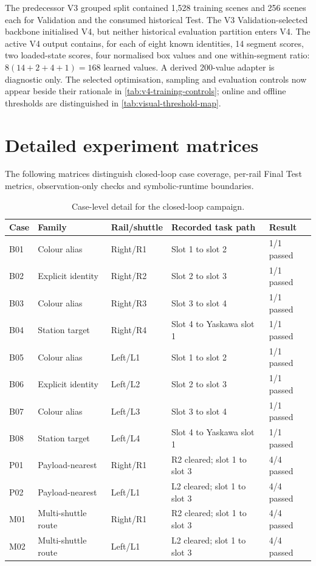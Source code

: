 The predecessor V3 grouped split contained 1,528 training scenes and 256 scenes
each for Validation and the consumed historical Test. The V3
Validation-selected backbone initialised V4, but neither historical evaluation
partition enters V4. The active V4 output contains, for each of eight known
identities, 14 segment scores, two loaded-state scores, four normalised box
values and one within-segment ratio: \(8(14+2+4+1)=168\) learned values. A
derived 200-value adapter is diagnostic only. The selected optimisation,
sampling and evaluation controls now appear beside their rationale in
\cref{tab:v4-training-controls}; online and offline thresholds are distinguished
in \cref{tab:visual-threshold-map}.

\FloatBarrier
\section{Detailed experiment matrices}

The following matrices distinguish closed-loop case coverage, per-rail Final
Test metrics, observation-only checks and symbolic-runtime boundaries.

\begin{table}[htbp]
\centering
\small
\caption{Case-level detail for the closed-loop campaign.}
\label{tab:campaign-case-details}
\begin{tabularx}{\textwidth}{@{}p{}p{}p{}Xp{}@{}}
\toprule
\textbf{Case} & \textbf{Family} & \textbf{Rail/shuttle} &
\textbf{Recorded task path} & \textbf{Result}\\
\midrule
B01 & Colour alias & Right/R1 & Slot 1 to slot 2 & 1/1 passed\\ \tablerowrule
B02 & Explicit identity & Right/R2 & Slot 2 to slot 3 & 1/1 passed\\ \tablerowrule
B03 & Colour alias & Right/R3 & Slot 3 to slot 4 & 1/1 passed\\ \tablerowrule
B04 & Station target & Right/R4 & Slot 4 to Yaskawa slot 1 & 1/1 passed\\
\tablerowrule
B05 & Colour alias & Left/L1 & Slot 1 to slot 2 & 1/1 passed\\ \tablerowrule
B06 & Explicit identity & Left/L2 & Slot 2 to slot 3 & 1/1 passed\\ \tablerowrule
B07 & Colour alias & Left/L3 & Slot 3 to slot 4 & 1/1 passed\\ \tablerowrule
B08 & Station target & Left/L4 & Slot 4 to Yaskawa slot 1 & 1/1 passed\\
\tablerowrule
P01 & Payload-nearest & Right/R1 & R2 cleared; slot 1 to slot 3 & 4/4 passed\\
\tablerowrule
P02 & Payload-nearest & Left/L1 & L2 cleared; slot 1 to slot 3 & 4/4 passed\\
\tablerowrule
M01 & Multi-shuttle route & Right/R1 & R2 cleared; slot 1 to slot 3 & 4/4 passed\\
\tablerowrule
M02 & Multi-shuttle route & Left/L1 & L2 cleared; slot 1 to slot 3 & 4/4 passed\\
\bottomrule
\end{tabularx}
\end{table}

